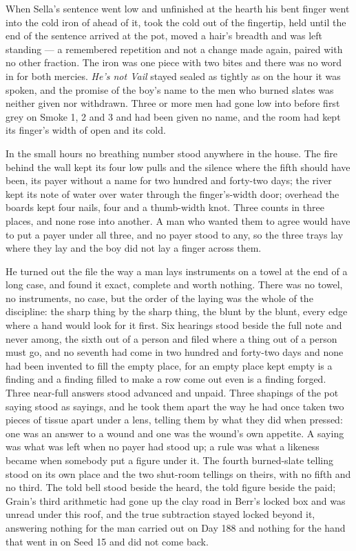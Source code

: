 When Sella's sentence went low and unfinished at the hearth his bent finger went into the cold iron of  ahead of it, took the cold out of the fingertip, held until the end of the sentence arrived at the pot, moved a hair's breadth and was left standing --- a remembered repetition and not a change made again, paired with no other fraction. The iron was one piece with two bites and there was no word in  for both mercies. \emph{He's not Vail} stayed sealed as tightly as on the hour it was spoken, and the promise of the boy's name to the men who burned slates was neither given nor withdrawn. Three or more men had gone low into  before first grey on Smoke 1, 2 and 3 and had been given no name, and the room had kept its finger's width of open and its cold.

\scenebreak

In the small hours no breathing number stood anywhere in the house. The fire behind the wall kept its four low pulls and the silence where the fifth should have been, its payer without a name for two hundred and forty-two days; the river kept its note of water over water through the finger's-width door; overhead the boards kept four nails, four and a thumb-width knot. Three counts in three places, and none rose into another. A man who wanted them to agree would have to put a payer under all three, and no payer stood to any, so the three trays lay where they lay and the boy did not lay a finger across them.

He turned out the file the way a man lays instruments on a towel at the end of a long case, and found it exact, complete and worth nothing. There was no towel, no instruments, no case, but the order of the laying was the whole of the discipline: the sharp thing by the sharp thing, the blunt by the blunt, every edge where a hand would look for it first. Six hearings stood beside the full note and never among, the sixth out of a person and filed where a thing out of a person must go, and no seventh had come in two hundred and forty-two days and none had been invented to fill the empty place, for an empty place kept empty is a finding and a finding filled to make a row come out even is a finding forged. Three near-full answers stood advanced and unpaid. Three shapings of the pot saying stood as sayings, and he took them apart the way he had once taken two pieces of tissue apart under a lens, telling them by what they did when pressed: one was an answer to a wound and one was the wound's own appetite. A saying was what was left when no payer had stood up; a rule was what a likeness became when somebody put a figure under it. The fourth burned-slate telling stood on its own place and the two shut-room tellings on theirs, with no fifth and no third. The told bell stood beside the heard, the told figure beside the paid; Grain's third arithmetic had gone up the clay road in Berr's locked box and was unread under this roof, and the true subtraction stayed locked beyond it, answering nothing for the man carried out on Day 188 and nothing for the hand that went in on Seed 15 and did not come back.

